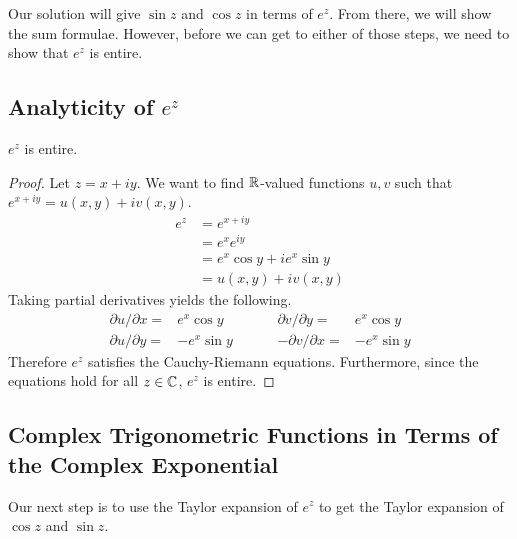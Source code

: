 \documentclass[notitlepage]{problem-solving}
\begin{document}
Our solution will give $\sin z$ and $\cos z$ in terms of $e^z$.
From there, we will show the sum formulae.
However, before we can get to either of those steps, we need to show that $e^z$ is entire.

\subsection{Analyticity of $e^{z}$}

\begin{proposition}
	$e^z$ is entire.
\end{proposition}
\begin{proof}
	Let $z=x+iy$.
	We want to find $\mathbb{R}$-valued functions $u,v$ such that $e^{x+iy}=u(x,y)+iv(x,y)$.
	\begin{align*}
		e^z &= e^{x+iy}\\
		&= e^x e^{iy}\\
		&= e^x \cos y + ie^x\sin y\\
		&= u(x,y) +iv(x,y)
	\end{align*}
	Taking partial derivatives yields the following.
	\[
		\begin{array}{rlrl}
			\partial u/\partial x =& e^x \cos y  \hspace{1cm}&  \partial v/\partial y =& e^x \cos y\\
			\partial u/\partial y =& -e^x \sin y \hspace{1cm}& -\partial v/\partial x =& -e^x \sin y
		\end{array}
	\]
	Therefore $e^z$ satisfies the Cauchy-Riemann equations.
	Furthermore, since the equations hold for all $z\in\mathbb{C}$, $e^z$ is entire.
\end{proof}

\subsection{Complex Trigonometric Functions in Terms of the Complex Exponential}

Our next step is to use the Taylor expansion of $e^z$ to get the Taylor expansion of $\cos z$ and $\sin z$.
\end{document}
